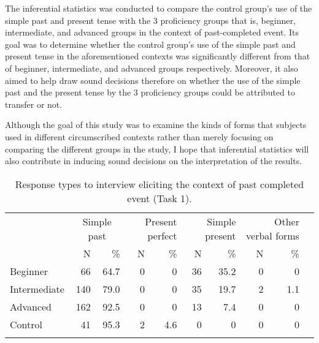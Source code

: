 \documentclass[output=paper,
modfonts
]{langscibook}
\begin{document}
The inferential statistics was conducted to compare the control group’s use of the simple past and present  tense with the 3 proficiency groups that is, beginner, intermediate, and advanced groups in the context of past-completed event. Its goal was to determine whether the control group’s use of the simple past and present  tense in the aforementioned contexts was significantly different from that of beginner, intermediate, and advanced groups respectively. Moreover, it also aimed to help draw sound decisions therefore on whether the use of the simple past and the present  tense by the 3 proficiency groups could be attributed to transfer or not.  

Although the goal of this study was to examine the kinds of forms that subjects used in different circumscribed contexts rather than merely focusing on comparing the different groups in the study, I hope that inferential statistics will also contribute in inducing sound decisions on the interpretation of the results.

\begin{table}
\caption{Response types to interview eliciting the context of past completed event (Task 1).}
\begin{tabular}{lrrrrrrrrr} 
\lsptoprule
& \multicolumn{2}{c}{Simple past}  & \multicolumn{2}{p{1.5cm}}{\centering Present perfect}  & \multicolumn{2}{p{1.5cm}}{\centering Simple present} & \multicolumn{2}{p{1.8cm}}{\centering  Other verbal forms}\\\cmidrule(lr){2-3}\cmidrule(lr){4-5}\cmidrule(lr){6-7}\cmidrule(lr){8-9}
& N & \% & N & \% & N & \% & N & \% \\\midrule
Beginner & 66& 64.7& 0& 0& 36& 35.2& 0      & 0\\
Intermediate & 140& 79.0& 0& 0& 35& 19.7& 2 & 1.1\\
Advanced & 162& 92.5& 0& 0& 13& 7.4& 0      & 0\\
Control & 41& 95.3& 2& 4.6& 0& 0& 0         & 0\\
\lspbottomrule
\end{tabular}
\label{tab:kabasele:3}
\end{table}
\end{document}
